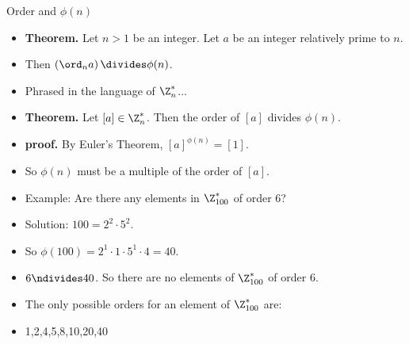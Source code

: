 \documentclass{beamer}
\begin{document}
\begin{frame}{Order and $\phi(n)$}

\begin{itemize}
  \item \textbf{Theorem.} Let $n>1$ be an integer. Let $a$ be an integer relatively prime to $n$.
  \item Then $\left( \ord_n a \right) \divides \phi(n)$.
  \item Phrased in the language of $\Z_n^*$...
  \item \textbf{Theorem.} Let $[a]\in\Z_n^*$. Then the order of $[a]$ divides $\phi(n)$.
  \item \textbf{proof.} By Euler's Theorem, $[a]^{\phi(n)}=[1]$.
  \item So $\phi(n)$ must be a multiple of the order of $[a]$.
  \item Example: Are there any elements in $\Z_{100}^*$ of order 6?
  \item Solution: $100=2^2\cdot 5^2$.
  \item So $\phi(100) = 2^1\cdot 1 \cdot 5^1 \cdot  4 = 40$.
  \item $6\ndivides 40$. So there are no elements of $\Z_{100}^*$ of order 6.
  \item The only possible orders for an element of $\Z_{100}^*$ are:
  \item 1,2,4,5,8,10,20,40
\end{itemize}
\end{frame}
\end{document}
